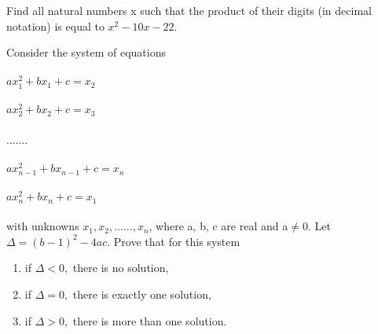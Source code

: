 \item Find all natural numbers x such that the product of their digits (in decimal
notation) is equal to $x^{2} - 10x - 22.$\\

\item Consider the system of equations\\
\\$ax_{1}^{2} + bx_1 + c = x_2$\\
\\$ax_{2}^{2} + bx_2 + c = x_3$\\
\\.......\\
\\$ax_{n-1}^{2} + bx_{n-1} + c = x_{n}$\\
\\$ax_{n}^{2} + bx_{n} + c = x_{1}$\\
\\with unknowns $x_1, x_2,......, x_n$, where a, b, c are real and a$\neq$0. Let $\Delta = (b - 1)^2 - 4ac.$ Prove that for this system\\
\begin{enumerate}
\item if $\Delta < 0,$ there is no solution,
\item if $\Delta = 0,$ there is exactly one solution,
\item if $\Delta > 0,$ there is more than one solution.
\end{enumerate}


